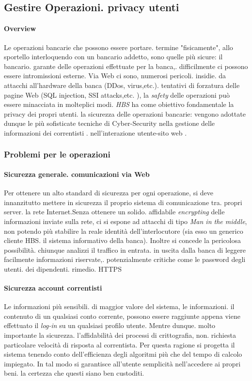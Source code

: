 
\subsection{Gestire Operazioni. privacy utenti}
\paragraph{Overview} Le operazioni bancarie che possono essere portare. termine "fisicamente", allo sportello interloquendo con un bancario addetto,  sono quelle più sicure: il bancario. garante delle operazioni effettuate per la banca,. difficilmente  ci possono essere intromissioni esterne.
 Via Web ci sono, numerosi pericoli. insidie. da attacchi all'hardware della banca (DDos, virus,etc.). tentativi di forzatura delle pagine Web (SQL injection, SSI attacks,etc. ), la \emph{safety} delle operazioni può essere minacciata in molteplici modi.
\emph{HBS} ha come obiettivo fondamentale la privacy dei propri utenti. la sicurezza delle operazioni bancarie: vengono adottate dunque le più sofisticate tecniche di Cyber-Security nella gestione delle informazioni dei correntisti . nell'interazione utente-sito web .

\subsubsection{Problemi per le operazioni}

	\paragraph{Sicurezza generale. comunicazioni via Web}
Per ottenere un alto standard di sicurezza per ogni operazione, si deve innanzitutto mettere in sicurezza il proprio sistema di comunicazione tra. propri server. la rete Internet.Senza ottenere un solido. affidabile \emph{encrypting} delle informazioni inviate sulla rete, ci si espone ad attacchi di tipo \emph{Man in the middle}, non potendo più stabilire la reale identità dell'interlocutore (sia esso un generico cliente HBS. il sistema informativo della banca). Inoltre si concede la pericolosa possibilità. chiunque analizzi il traffico in entrata. in uscita dalla banca di leggere facilmente informazioni riservate,. potenzialmente critiche come le password degli utenti. dei dipendenti.
rimedio. HTTPS


	\paragraph{Sicurezza account correntisti}
Le informazioni più sensibili. di maggior valore del sistema, le informazioni. il contenuto di un qualsiasi conto corrente, possono essere raggiunte appena viene effettuato il \emph{log-in} su un qualsiasi profilo utente. Mentre dunque. molto importante la sicurezza. l'affidabilità dei processi di crittografia, non. richiesta particolare velocità di risposta al correntista. Per questa ragione si progetta il sistema tenendo conto dell'efficienza degli algoritmi più che del tempo di calcolo impiegato.
In tal modo si garantisce all'utente semplicità nell'accedere ai propri beni. la certezza che questi siano ben custoditi.



